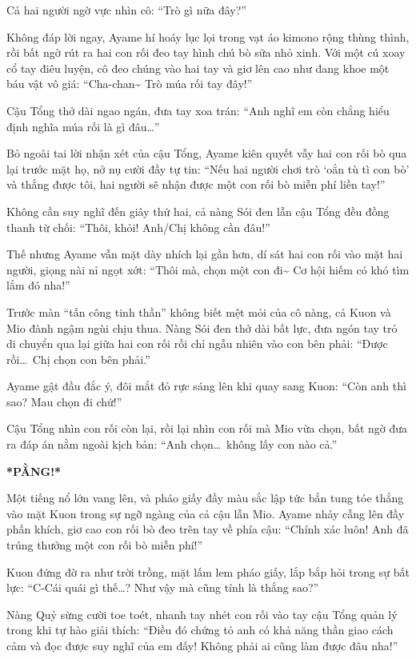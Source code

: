 \documentclass[../main.tex]{subfiles}
\begin{document}
Cả hai người ngờ vực nhìn cô:
``Trò gì nữa đây?''

Không đáp lời ngay, Ayame hí hoáy lục lọi trong vạt áo kimono rộng thùng thình, rồi bất ngờ rút ra hai con rối đeo tay hình chú bò sữa nhỏ xinh. Với một cú xoay cổ tay điêu luyện, cô đeo chúng vào hai tay và giơ lên cao như đang khoe một báu vật vô giá:
``Cha-chan\~{} Trò múa rối tay đây!''


Cậu Tổng thở dài ngao ngán, đưa tay xoa trán:
``Anh nghĩ em còn chẳng hiểu định nghĩa múa rối là gì đâu\dots''

Bỏ ngoài tai lời nhận xét của cậu Tổng, Ayame kiên quyết vẫy hai con rối bò qua lại trước mặt họ, nở nụ cười đầy tự tin:
``Nếu hai người chơi trò `oẳn tù tì con bò' và thắng được tôi, hai người sẽ nhận được một con rối bò miễn phí liền tay!''

Không cần suy nghĩ đến giây thứ hai, cả nàng Sói đen lẫn cậu Tổng đều đồng thanh từ chối:
``Thôi, khỏi! Anh/Chị không cần đâu!''

Thế nhưng Ayame vẫn mặt dày nhích lại gần hơn, dí sát hai con rối vào mặt hai người, giọng nài nỉ ngọt xớt:
``Thôi mà, chọn một con đi\~{} Cơ hội hiếm có khó tìm lắm đó nha!''

Trước màn ``tấn công tinh thần'' không biết mệt mỏi của cô nàng, cả Kuon và Mio đành ngậm ngùi chịu thua. Nàng Sói đen thở dài bất lực, đưa ngón tay trỏ di chuyển qua lại giữa hai con rối rồi chỉ ngẫu nhiên vào con bên phải:
``Được rồi\dots\ Chị chọn con bên phải.''

Ayame gật đầu đắc ý, đôi mắt đỏ rực sáng lên khi quay sang Kuon:
``Còn anh thì sao? Mau chọn đi chứ!''

Cậu Tổng nhìn con rối còn lại, rồi lại nhìn con rối mà Mio vừa chọn, bất ngờ đưa ra đáp án nằm ngoài kịch bản:
``Anh chọn\dots\ không lấy con nào cả.''

\textbf{*PẰNG!*}

Một tiếng nổ lớn vang lên, và pháo giấy đầy màu sắc lập tức bắn tung tóe thẳng vào mặt Kuon trong sự ngỡ ngàng của cả cậu lẫn Mio. Ayame nhảy cẫng lên đầy phấn khích, giơ cao con rối bò đeo trên tay về phía cậu:
``Chính xác luôn! Anh đã trúng thưởng một con rối bò miễn phí!''

Kuon đứng đờ ra như trời trồng, mặt lấm lem pháo giấy, lắp bắp hỏi trong sự bất lực:
``C-Cái quái gì thế\dots? Như vậy mà cũng tính là thắng sao?''

Nàng Quỷ sừng cười toe toét, nhanh tay nhét con rối vào tay cậu Tổng quản lý trong khi tự hào giải thích:
``Điều đó chứng tỏ anh có khả năng thần giao cách cảm và đọc được suy nghĩ của em đấy! Không phải ai cũng làm được đâu nha!''
\end{document}

